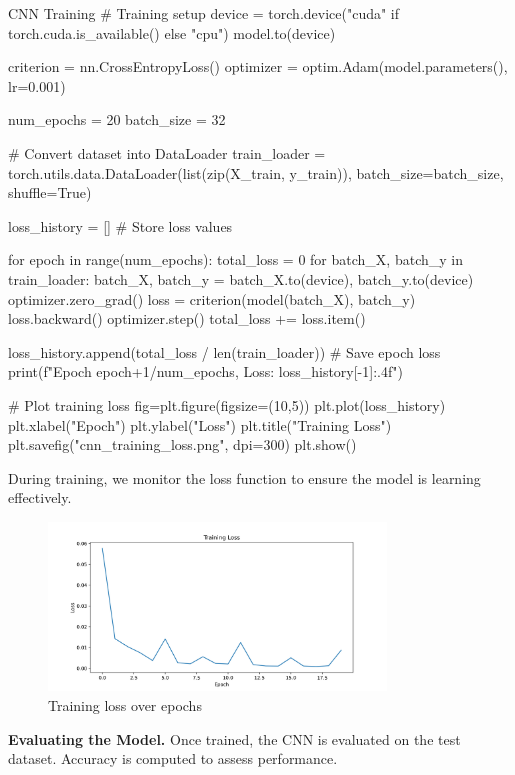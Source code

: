 \begin{codeonly}{CNN Training}
# Training setup
device = torch.device("cuda" if torch.cuda.is_available() else "cpu")
model.to(device)

criterion = nn.CrossEntropyLoss()
optimizer = optim.Adam(model.parameters(), lr=0.001)

num_epochs = 20
batch_size = 32

# Convert dataset into DataLoader
train_loader = torch.utils.data.DataLoader(list(zip(X_train, y_train)), batch_size=batch_size, shuffle=True)

loss_history = []  # Store loss values

for epoch in range(num_epochs):
    total_loss = 0
    for batch_X, batch_y in train_loader:
        batch_X, batch_y = batch_X.to(device), batch_y.to(device)
        optimizer.zero_grad()
        loss = criterion(model(batch_X), batch_y)
        loss.backward()
        optimizer.step()
        total_loss += loss.item()
    
    loss_history.append(total_loss / len(train_loader))  # Save epoch loss
    print(f"Epoch {epoch+1}/{num_epochs}, Loss: {loss_history[-1]:.4f}")

# Plot training loss
fig=plt.figure(figsize=(10,5))
plt.plot(loss_history)
plt.xlabel("Epoch")
plt.ylabel("Loss")
plt.title("Training Loss")
plt.savefig("cnn_training_loss.png", dpi=300)
plt.show()
\end{codeonly}

During training, we monitor the loss function to ensure the model is learning effectively.

\begin{figure}[h]
    \centering
    \includegraphics[width=0.8\textwidth]{images/cnn_training_loss.png}
    \caption{Training loss over epochs}
    \label{fig:training_loss}
\end{figure}

{\bf Evaluating the Model.} Once trained, the CNN is evaluated on the test dataset. Accuracy is computed to assess performance.

